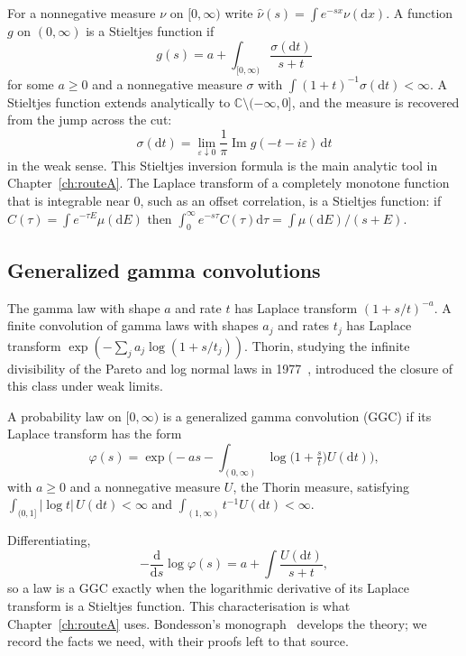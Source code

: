 For a nonnegative measure $\nu$ on $[0,\infty)$ write $\hat\nu(s)=\int e^{-sx}\nu(\mathrm dx)$. A function $g$ on $(0,\infty)$ is a Stieltjes function if
\[
g(s)=a+\int_{[0,\infty)}\frac{\sigma(\mathrm dt)}{s+t}
\]
for some $a\ge0$ and a nonnegative measure $\sigma$ with $\int(1+t)^{-1}\sigma(\mathrm dt)<\infty$. A Stieltjes function extends analytically to $\mathbb C\setminus(-\infty,0]$, and the measure is recovered from the jump across the cut:
\[
\sigma(\mathrm dt)=\lim_{\varepsilon\downarrow0}\frac{1}{\pi}\operatorname{Im}g(-t-i\varepsilon)\,\mathrm dt
\]
in the weak sense. This Stieltjes inversion formula is the main analytic tool in Chapter~\ref{ch:routeA}. The Laplace transform of a completely monotone function that is integrable near $0$, such as an offset correlation, is a Stieltjes function: if $C(\tau)=\int e^{-\tau E}\mu(\mathrm dE)$ then $\int_0^\infty e^{-s\tau}C(\tau)\mathrm d\tau=\int\mu(\mathrm dE)/(s+E)$.

\subsection{Generalized gamma convolutions}\label{sec:ggc}

The gamma law with shape $a$ and rate $t$ has Laplace transform $(1+s/t)^{-a}$. A finite convolution of gamma laws with shapes $a_j$ and rates $t_j$ has Laplace transform $\exp(-\sum_ja_j\log(1+s/t_j))$. Thorin, studying the infinite divisibility of the Pareto and log normal laws in 1977~\cite{Th77,Th77b}, introduced the closure of this class under weak limits.

\begin{definition}
A probability law on $[0,\infty)$ is a generalized gamma convolution (GGC) if its Laplace transform has the form
\[
\varphi(s)=\exp\Big(-a s-\int_{(0,\infty)}\log\big(1+\tfrac st\big)U(\mathrm dt)\Big),
\]
with $a\ge0$ and a nonnegative measure $U$, the Thorin measure, satisfying $\int_{(0,1]}|\log t|\,U(\mathrm dt)<\infty$ and $\int_{(1,\infty)}t^{-1}U(\mathrm dt)<\infty$.
\end{definition}

Differentiating,
\[
-\frac{\mathrm d}{\mathrm ds}\log\varphi(s)=a+\int\frac{U(\mathrm dt)}{s+t},
\]
so a law is a GGC exactly when the logarithmic derivative of its Laplace transform is a Stieltjes function. This characterisation is what Chapter~\ref{ch:routeA} uses. Bondesson's monograph~\cite{Bo92} develops the theory; we record the facts we need, with their proofs left to that source.

